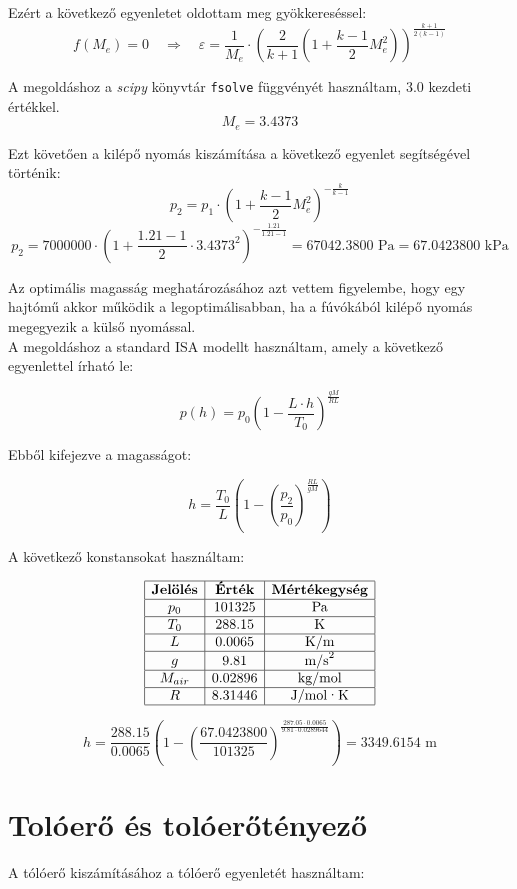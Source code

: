 \documentclass[a4paper,12pt]{article}
\begin{document}
Ezért a következő egyenletet oldottam meg gyökkereséssel:
\[
f(M_e) = 0 \quad \Rightarrow \quad \varepsilon = \frac{1}{M_e} \cdot \left( \frac{2}{k+1} \left(1 + \frac{k-1}{2}M_e^2 \right) \right)^{\frac{k+1}{2(k-1)}}
\]

A megoldáshoz a \textit{scipy} könyvtár \texttt{fsolve} függvényét használtam, 3.0 kezdeti értékkel.\\

\[
M_e = 3.4373
\]

Ezt követően a kilépő nyomás kiszámítása a következő egyenlet segítségével történik:
\[
p_2 = p_1 \cdot \left(1 + \frac{k - 1}{2} M_e^2 \right)^{-\frac{k}{k - 1}}
\]
\[
p_2 = 7000000 \cdot \left(1 + \frac{1.21 - 1}{2} \cdot 3.4373^2 \right)^{-\frac{1.21}{1.21 - 1}} = 67042.3800 \text{ Pa} = 67.0423800 \text{ kPa}
\]

Az optimális magasság meghatározásához azt vettem figyelembe, hogy egy hajtómű akkor működik a legoptimálisabban, ha a fúvókából kilépő nyomás megegyezik a külső nyomással.\\
A megoldáshoz a standard ISA modellt használtam, amely a következő egyenlettel írható le:

\[
p(h) = p_0 \left(1 - \frac{L \cdot h}{T_0} \right)^{\frac{g M}{R L}}
\]

Ebből kifejezve a magasságot:

\[
h = \frac{T_0}{L} \left( 1 - \left( \frac{p_2}{p_0} \right)^{\frac{R L}{g M}} \right)
\]

A következő konstansokat használtam:

\[
\begin{array}{|c|c|c|}
\hline
\textbf{Jelölés} & \textbf{Érték} & \textbf{Mértékegység} \\
\hline
p_0 & 101325 & \text{Pa} \\
\hline
T_0 & 288.15 & \text{K} \\
\hline
L & 0.0065 & \text{K/m} \\
\hline
g & 9.81 & \text{m/s}^2 \\
\hline
M_{air} & 0.02896 & \text{kg/mol} \\
\hline
R & 8.31446 & \text{J/mol·K} \\
\hline
\end{array}
\]

\[
h = \frac{288.15}{0.0065} \left( 1 - \left( \frac{67.0423800}{101325} \right)^{\frac{287.05 \cdot 0.0065}{9.81 \cdot 0.0289644}} \right) = 3349.6154 \text{ m}
\]

\section{Tolóerő és tolóerőtényező}
A tólóerő kiszámításához a tólóerő egyenletét használtam:
\end{document}
